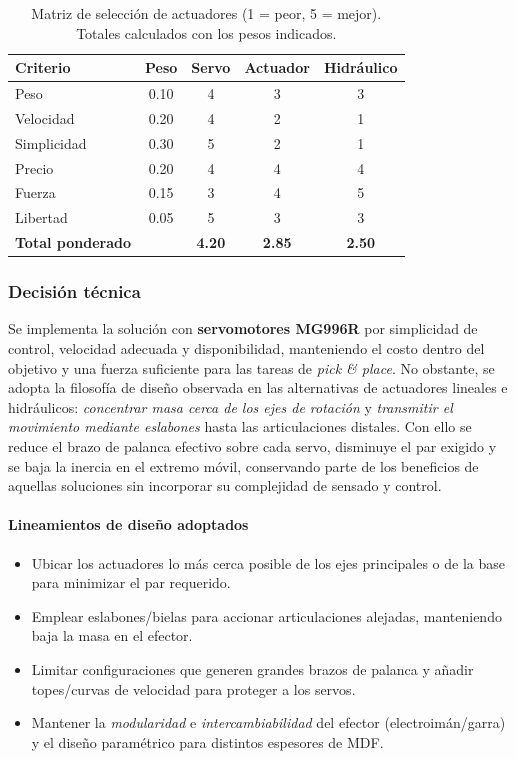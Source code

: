 \begin{table}[H]
\centering
\begin{tabular}{l c c c c}
\toprule
\textbf{Criterio} & \textbf{Peso} & \textbf{Servo} & \textbf{Actuador} & \textbf{Hidráulico} \\
\midrule
Peso        & 0.10 & 4 & 3 & 3 \\
Velocidad   & 0.20 & 4 & 2 & 1 \\
Simplicidad & 0.30 & 5 & 2 & 1 \\
Precio      & 0.20 & 4 & 4 & 4 \\
Fuerza      & 0.15 & 3 & 4 & 5 \\
Libertad    & 0.05 & 5 & 3 & 3 \\
\midrule
\textbf{Total ponderado} &       & \textbf{4.20} & \textbf{2.85} & \textbf{2.50} \\
\bottomrule
\end{tabular}
\caption{Matriz de selección de actuadores (1 = peor, 5 = mejor). Totales calculados con los pesos indicados.}
\end{table}


\subsubsection*{Decisión técnica}
Se implementa la solución con \textbf{servomotores MG996R} por simplicidad de control, velocidad adecuada y disponibilidad, manteniendo el costo dentro del objetivo y una fuerza suficiente para las tareas de \emph{pick \& place}. 
No obstante, se adopta la filosofía de diseño observada en las alternativas de actuadores lineales e hidráulicos: 
\emph{concentrar masa cerca de los ejes de rotación} y \emph{transmitir el movimiento mediante eslabones} hasta las articulaciones distales. 
Con ello se reduce el brazo de palanca efectivo sobre cada servo, disminuye el par exigido y se baja la inercia en el extremo móvil, 
conservando parte de los beneficios de aquellas soluciones sin incorporar su complejidad de sensado y control.

\paragraph{Lineamientos de diseño adoptados}
\begin{itemize}
  \item Ubicar los actuadores lo más cerca posible de los ejes principales o de la base para minimizar el par requerido.
  \item Emplear eslabones/bielas para accionar articulaciones alejadas, manteniendo baja la masa en el efector.
  \item Limitar configuraciones que generen grandes brazos de palanca y añadir topes/curvas de velocidad para proteger a los servos.
  \item Mantener la \emph{modularidad} e \emph{intercambiabilidad} del efector (electroimán/garra) y el diseño paramétrico para distintos espesores de MDF.\@
\end{itemize}

